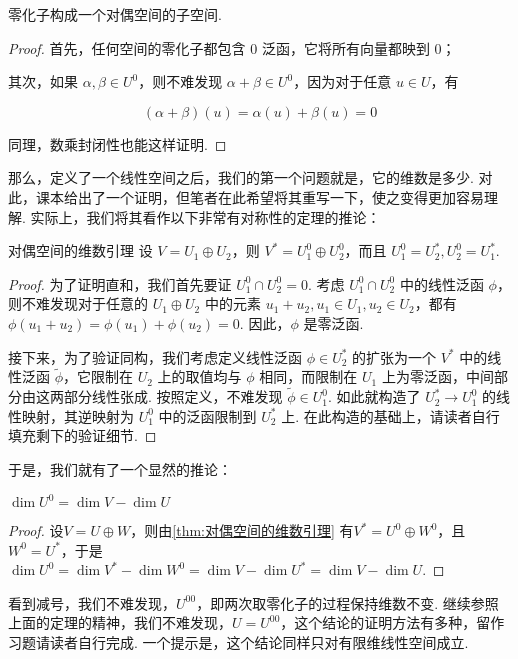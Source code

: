 \begin{theorem}{}{}
    零化子构成一个对偶空间的子空间.
\end{theorem}

\begin{proof}
    首先，任何空间的零化子都包含 $0$ 泛函，它将所有向量都映到 $0$；

    其次，如果 $\alpha, \beta \in U^0$，则不难发现 $\alpha + \beta \in U^0$，因为对于任意 $u \in U$，有

    \[
        (\alpha + \beta) (u) = \alpha (u) + \beta (u) = 0
    \]

    同理，数乘封闭性也能这样证明.
\end{proof}

那么，定义了一个线性空间之后，我们的第一个问题就是，它的维数是多少. 对此，课本给出了一个证明，但笔者在此希望将其重写一下，使之变得更加容易理解. 实际上，我们将其看作以下非常有对称性的定理的推论：

\begin{theorem}{}{对偶空间的维数引理}
    设 $V = U_1 \oplus U_2$，则 $V^* = U_1^0 \oplus U_2^0$，而且 $U_1^0 = U_2^*, U_2^0 = U_1^*$.
\end{theorem}


\begin{proof}
    为了证明直和，我们首先要证 $U_1^0 \cap U_2^0 = 0$. 考虑 $U_1^0 \cap U_2^0$ 中的线性泛函 $\phi$，则不难发现对于任意的 $U_1 \oplus U_2$ 中的元素 $u_1 + u_2, u_1 \in U_1, u_2 \in U_2$，都有 $\phi(u_1 + u_2) = \phi(u_1) + \phi(u_2) = 0$. 因此，$\phi$ 是零泛函.

    接下来，为了验证同构，我们考虑定义线性泛函 $\phi \in U_2^*$ 的扩张为一个 $V^*$ 中的线性泛函 $\tilde{\phi}$，它限制在 $U_2$ 上的取值均与 $\phi$ 相同，而限制在 $U_1$ 上为零泛函，中间部分由这两部分线性张成. 按照定义，不难发现 $\tilde \phi \in U_1^0$. 如此就构造了 $U_2^* \to U_1^0$ 的线性映射，其逆映射为 $U_1^0$ 中的泛函限制到 $U_2^*$ 上. 在此构造的基础上，请读者自行填充剩下的验证细节.
\end{proof}

于是，我们就有了一个显然的推论：

\begin{theorem}{}{}
    $\dim U^0 = \dim V - \dim U$
\end{theorem}
\begin{proof}
    设$V=U\oplus W$，则由\autoref{thm:对偶空间的维数引理} 有$V^*=U^0\oplus W^0$，且$W^0=U^*$，于是$\dim U^0=\dim V^*-\dim W^0=\dim V-\dim U^*=\dim V-\dim U$.
\end{proof}
看到减号，我们不难发现，$U^{00}$，即两次取零化子的过程保持维数不变. 继续参照上面的定理的精神，我们不难发现，$U = U^{00}$，这个结论的证明方法有多种，留作习题请读者自行完成. 一个提示是，这个结论同样只对有限维线性空间成立.

